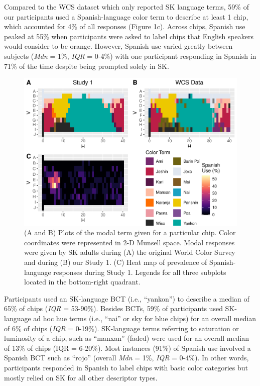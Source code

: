 \documentclass[
  english,
  ,man,floatsintext]{apa6}
\begin{document}
Compared to the WCS dataset which only reported SK language terms, 59\% of our participants used a Spanish-language color term to describe at least 1 chip, which accounted for 4\% of all responses (Figure 1c). Across chips, Spanish use peaked at 55\% when participants were asked to label chips that English speakers would consider to be orange. However, Spanish use varied greatly between subjects (\emph{Mdn} = 1\%, \emph{IQR} = 0-4\%) with one participant responding in Spanish in 71\% of the time despite being prompted solely in SK.

\begin{figure}
\centering
\includegraphics{amazon_color_files/figure-latex/adultfigure-1.pdf}
\caption{\label{fig:adultfigure}(A and B) Plots of the modal term given for a particular chip. Color coordinates were represented in 2-D Munsell space. Modal responses were given by SK adults during (A) the original World Color Survey and during (B) our Study 1. (C) Heat map of prevalence of Spanish-language responses during Study 1. Legends for all three subplots located in the bottom-right quadrant.}
\end{figure}

Participants used an SK-language BCT (i.e., \enquote{yankon}) to describe a median of 65\% of chips (\emph{IQR} = 53-90\%). Besides BCTs, 59\% of participants used SK-language ad hoc hue terms (i.e., \enquote{nai} or sky for blue chips) for an overall median of 6\% of chips (\emph{IQR} = 0-19\%). SK-language terms referring to saturation or luminosity of a chip, such as \enquote{manxan} (faded) were used for an overall median of 13\% of chips (IQR = 6-20\%). Most instances (91\%) of Spanish use involved a Spanish BCT such as \enquote{rojo} (overall \emph{Mdn} = 1\%, \emph{IQR} = 0-4\%). In other words, participants responded in Spanish to label chips with basic color categories but mostly relied on SK for all other descriptor types.
\end{document}
